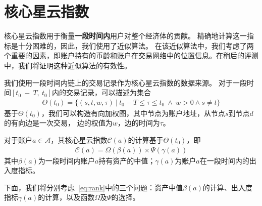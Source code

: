 \section{核心星云指数}

核心星云指数用于衡量{\textbf{一段时间内}}用户对整个经济体的贡献。
精确地计算这一指标是十分困难的，因此，我们使用了近似算法。
在该近似算法中，我们考虑了两个重要的因素，即账户持有的币龄和账户在交易网络中的位置信息。在稍后的评测中，我们将证明这种近似算法的有效性。


我们使用一段时间内链上的交易记录作为核心星云指数的数据来源。
对于一段时间$[t_0\ −\ T,\ t_0]$内的交易记录，可以描述为集合
\begin{align}
\Theta(t_0) = \{(s, t, w, \tau)\ |\ t_0 - T \le \tau \le t_0\ \land \ w > 0 \land s \neq t \}
\end{align}
\noindent 基于$\Theta(t_0)$，我们可以构造有向加权图，其中节点为账户地址，从节点$s$到节点$d$的有向边是一次交易，
边的权值为$w$，边的时间为$\tau$。


对于账户$a \in \mathcal{A}$，其核心星云指数$\mathcal{C}(a)$的计算基于$\Theta(t_0)$，即
\begin{align}
\mathcal{C}(a) = \Omega(\beta(a)) \times{} \Psi(\gamma(a))
\label{eq:rank}
\end{align}
\noindent 其中$\beta(a)$为一段时间内账户$a$持有资产的中值；$\gamma(a)$为账户$a$在一段时间内的出入度指标。




下面，我们将分别考虑~\ref{eq:rank}中的三个问题：资产中值$\beta(a)$的计算、出入度指标$\gamma(a)$的计算，以及函数$\Omega$及$\Psi$的选择。

